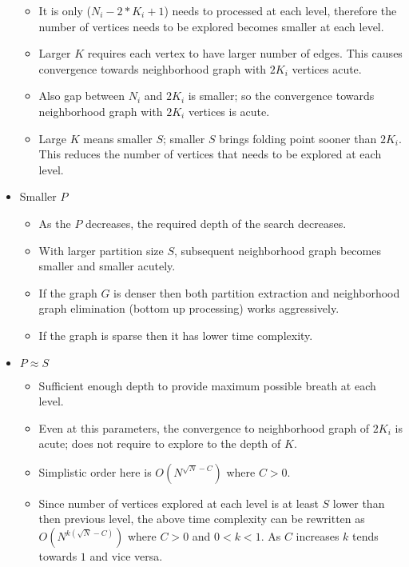 \documentclass[landscape]{slides}
\begin{document}
\begin{slide}
\begin{itemize}
\begin{itemize}
			\item It is only ($N_i - 2 * K_i + 1$) needs to processed at each level, therefore the number of vertices needs to be explored becomes smaller at each level.
			\item Larger $K$ requires each vertex to have larger number of edges. This causes convergence towards neighborhood graph with $2K_i$ vertices acute.
			\item Also gap between $N_i$ and $2K_i$ is smaller; so the convergence towards neighborhood graph with $2K_i$ vertices is acute.
			\item Large $K$ means smaller $S$; smaller $S$ brings folding point sooner than $2K_i$. This reduces the number of vertices that needs to be explored at each level.
		\end{itemize} 
		\item Smaller $P$
		\begin{itemize}
			\setlength{\itemsep}{0pt}
			\setlength{\parskip}{5pt}
			\setlength{\parsep}{0pt}
			\item As the $P$ decreases, the required depth of the search decreases.
			\item With larger partition size $S$, subsequent neighborhood graph becomes smaller and smaller acutely.
			\item If the graph $G$ is denser then both partition extraction and neighborhood graph elimination (bottom up processing) works aggressively.
			\item If the graph is sparse then it has lower time complexity.
		\end{itemize} 
		\item $P \approx S$
		\begin{itemize}
			\setlength{\itemsep}{0pt}
			\setlength{\parskip}{5pt}
			\setlength{\parsep}{0pt}
			\item Sufficient enough depth to provide maximum possible breath at each level.
			\item Even at this parameters, the convergence to neighborhood graph of $2K_i$ is acute; does not require to explore to the depth of $K$.
			\item Simplistic order here is $O(N^{\sqrt{N}-C})$ where $C > 0$.
			\item Since number of vertices explored at each level is at least $S$ lower than then previous level, the above time complexity can be rewritten as $O(N^{k(\sqrt{N} - C)})$ where $C > 0$ and $0 < k < 1$. As $C$ increases $k$ tends towards $1$ and vice versa.
		\end{itemize} 
	\end{itemize}
\end{slide}
\end{document}
